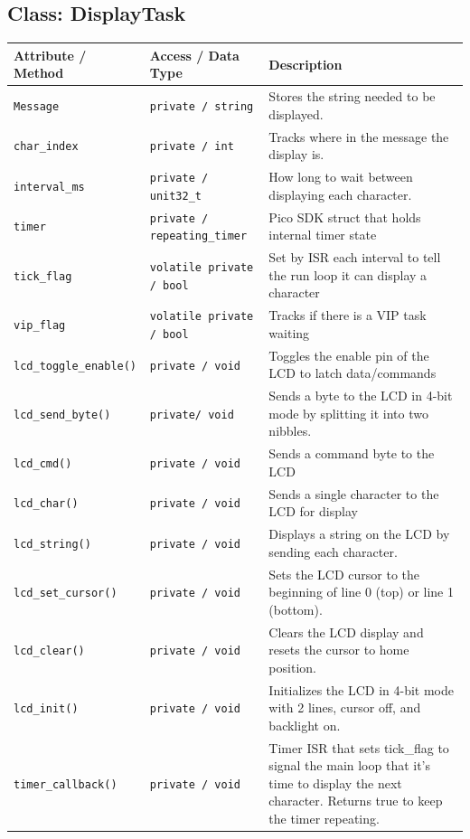\documentclass[12pt]{article}
\begin{document}
\paragraph{ }
\subsection*{Class: DisplayTask}

\begin{longtable}{P{3.5cm} P{3.8cm} P{6.7cm}}
\toprule
\textbf{Attribute / Method} & \textbf{Access / Data Type} & \textbf{Description} \\
\midrule
\endhead

\texttt{Message}      & \texttt{private / string}         & Stores the string needed to be displayed. \\
\texttt{char\_index}             & \texttt{private / int}  & Tracks where in the message the display is. \\
\texttt{interval\_ms}            & \texttt{private / unit32\_t} & How long to wait between displaying each character. \\
\texttt{timer}           & \texttt{private / repeating\_timer}              & Pico SDK struct that holds internal timer state \\
\texttt{tick\_flag}            & \texttt{volatile private / bool}               & Set by ISR each interval to tell the run loop it can display a character \\
\texttt{vip\_flag}            & \texttt{volatile private / bool}               & Tracks if there is a VIP task waiting \\

\texttt{lcd\_toggle\_enable()} & \texttt{private / void}        & Toggles the enable pin of the LCD to latch data/commands \\
\texttt{lcd\_send\_byte()} & \texttt{private/ void}        & Sends a byte to the LCD in 4-bit mode by splitting it into two nibbles. \\
\texttt{lcd\_cmd()} & \texttt{private / void}        & Sends a command byte to the LCD \\
\texttt{lcd\_char()} & \texttt{private / void}        & Sends a single character to the LCD for display \\
\texttt{lcd\_string()} & \texttt{private / void}        & Displays a string on the LCD by sending each character. \\
\texttt{lcd\_set\_cursor()} & \texttt{private / void}        & Sets the LCD cursor to the beginning of line 0 (top) or line 1 (bottom). \\
\texttt{lcd\_clear()} & \texttt{private / void}        & Clears the LCD display and resets the cursor to home position. \\
\texttt{lcd\_init()} & \texttt{private / void}        & Initializes the LCD in 4-bit mode with 2 lines, cursor off, and backlight on. \\
\texttt{timer\_callback()} & \texttt{private / void}        & Timer ISR that sets tick\_flag to signal the main loop that it's time to display the next character. Returns true to keep the timer repeating. \\


\end{longtable}
\end{document}
